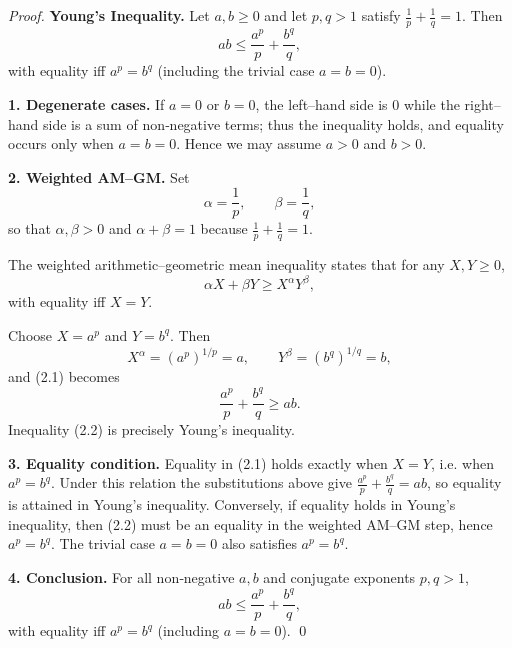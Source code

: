 \begin{proof}
\textbf{Young’s Inequality.}
Let $a,b\ge0$ and let $p,q>1$ satisfy $\displaystyle\frac1p+\frac1q=1$. Then
\[
ab\le\frac{a^{p}}{p}+\frac{b^{q}}{q},
\]
with equality iff $a^{p}=b^{q}$ (including the trivial case $a=b=0$).

\medskip
\textbf{1. Degenerate cases.}
If $a=0$ or $b=0$, the left–hand side is $0$ while the right–hand side is a sum of non‑negative terms; thus the inequality holds, and equality occurs only when $a=b=0$. Hence we may assume $a>0$ and $b>0$.

\medskip
\textbf{2. Weighted AM–GM.}
Set
\[
\alpha=\frac1p,\qquad \beta=\frac1q,
\]
so that $\alpha,\beta>0$ and $\alpha+\beta=1$ because $\frac1p+\frac1q=1$.

The weighted arithmetic–geometric mean inequality states that for any $X,Y\ge0$,
\begin{equation*}
\alpha X+\beta Y\ge X^{\alpha}Y^{\beta},
\tag{2.1}
\end{equation*}
with equality iff $X=Y$.

Choose $X=a^{p}$ and $Y=b^{q}$. Then
\[
X^{\alpha}=(a^{p})^{1/p}=a,\qquad
Y^{\beta}=(b^{q})^{1/q}=b,
\]
and (2.1) becomes
\begin{equation*}
\frac{a^{p}}{p}+\frac{b^{q}}{q}\ge ab .
\tag{2.2}
\end{equation*}
Inequality (2.2) is precisely Young’s inequality.

\medskip
\textbf{3. Equality condition.}
Equality in (2.1) holds exactly when $X=Y$, i.e. when $a^{p}=b^{q}$. Under this relation the substitutions above give $\frac{a^{p}}{p}+\frac{b^{q}}{q}=ab$, so equality is attained in Young’s inequality. Conversely, if equality holds in Young’s inequality, then (2.2) must be an equality in the weighted AM–GM step, hence $a^{p}=b^{q}$. The trivial case $a=b=0$ also satisfies $a^{p}=b^{q}$.

\medskip
\textbf{4. Conclusion.}
For all non‑negative $a,b$ and conjugate exponents $p,q>1$,
\[
ab\le\frac{a^{p}}{p}+\frac{b^{q}}{q},
\]
with equality iff $a^{p}=b^{q}$ (including $a=b=0$). \qed
\end{proof}
